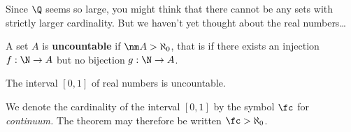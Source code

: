 Since $\Q$ seems so large, you might think that there cannot be any sets with strictly larger cardinality. But we haven't yet thought about the real numbers\ldots

\begin{defn}
A set $A$ is \textbf{uncountable} if $\nm A>\aleph_0$, that is if there exists an injection $f:\N\to A$ but no bijection $g:\N\to A$.
\end{defn}

\begin{thm}\label{thm:Cantordiag}
The interval $[0,1]$ of real numbers is uncountable.
\end{thm}

\noindent We denote the cardinality of the interval $[0,1]$ by the symbol $\fc$ for \emph{continuum.} The theorem may therefore be written $\fc>\aleph_0$.

